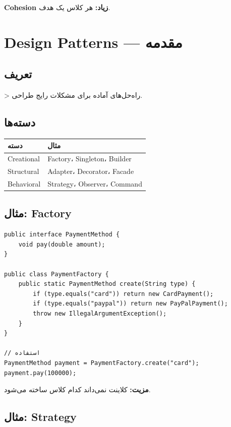 \documentclass[12pt, a4paper]{article}
\begin{document}
\textbf{Cohesion زیاد:} هر کلاس یک هدف.

\section{Design Patterns — مقدمه}

\subsection{تعریف}
> راه‌حل‌های آماده برای مشکلات رایج طراحی.

\subsection{دسته‌ها}

\begin{center}
\begin{tabular}{|l|p{9cm}|}
\hline
\textbf{دسته} & \textbf{مثال} \\
\hline
Creational & Factory، Singleton، Builder \\
\hline
Structural & Adapter، Decorator، Facade \\
\hline
Behavioral & Strategy، Observer، Command \\
\hline
\end{tabular}
\end{center}

\subsection{مثال: Factory}

\begin{lstlisting}
public interface PaymentMethod {
    void pay(double amount);
}

public class PaymentFactory {
    public static PaymentMethod create(String type) {
        if (type.equals("card")) return new CardPayment();
        if (type.equals("paypal")) return new PayPalPayment();
        throw new IllegalArgumentException();
    }
}

// استفاده
PaymentMethod payment = PaymentFactory.create("card");
payment.pay(100000);
\end{lstlisting}

\textbf{مزیت:} کلاینت نمی‌داند کدام کلاس ساخته می‌شود.

\subsection{مثال: Strategy}
\end{document}
